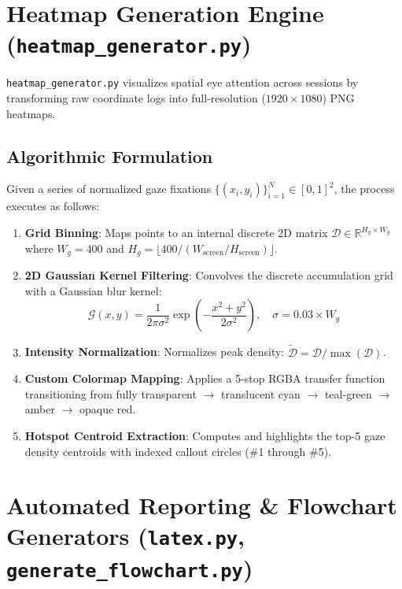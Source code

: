 \documentclass[11pt,a4paper]{article}
\begin{document}
\section{Heatmap Generation Engine (\texttt{heatmap_generator.py})}

\texttt{heatmap\_generator.py} visualizes spatial eye attention across sessions by transforming raw coordinate logs into full-resolution ($1920 \times 1080$) PNG heatmaps.

\subsection{Algorithmic Formulation}
Given a series of normalized gaze fixations $\{(x_i, y_i)\}_{i=1}^N \in [0, 1]^2$, the process executes as follows:
\begin{enumerate}
    \item \textbf{Grid Binning}: Maps points to an internal discrete 2D matrix $\mathcal{D} \in \mathbb{R}^{H_g \times W_g}$ where $W_g = 400$ and $H_g = \lfloor 400 / (W_{\text{screen}} / H_{\text{screen}}) \rfloor$.
    \item \textbf{2D Gaussian Kernel Filtering}: Convolves the discrete accumulation grid with a Gaussian blur kernel:
    \begin{equation}
    \mathcal{G}(x, y) = \frac{1}{2\pi \sigma^2} \exp\left(-\frac{x^2 + y^2}{2\sigma^2}\right), \quad \sigma = 0.03 \times W_g
    \end{equation}
    \item \textbf{Intensity Normalization}: Normalizes peak density: $\tilde{\mathcal{D}} = \mathcal{D} / \max(\mathcal{D})$.
    \item \textbf{Custom Colormap Mapping}: Applies a 5-stop RGBA transfer function transitioning from fully transparent $\rightarrow$ translucent cyan $\rightarrow$ teal-green $\rightarrow$ amber $\rightarrow$ opaque red.
    \item \textbf{Hotspot Centroid Extraction}: Computes and highlights the top-5 gaze density centroids with indexed callout circles (\#1 through \#5).
\end{enumerate}

\section{Automated Reporting \& Flowchart Generators (\texttt{latex.py}, \texttt{generate_flowchart.py})}
\end{document}
